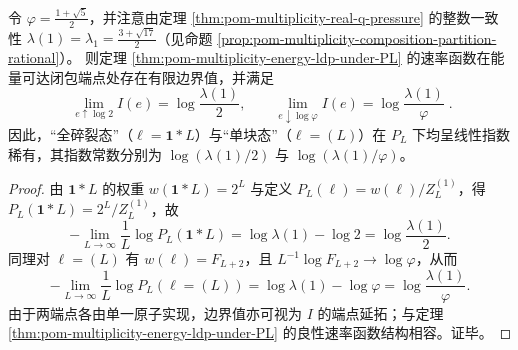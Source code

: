 \begin{corollary}\label{cor:pom-multiplicity-energy-ldp-boundary}
令 \(\varphi=\frac{1+\sqrt5}{2}\)，并注意由定理 \ref{thm:pom-multiplicity-real-q-pressure} 的整数一致性
\(
\lambda(1)=\lambda_1=\frac{3+\sqrt{17}}{2}
\)（见命题 \ref{prop:pom-multiplicity-composition-partition-rational}）。
则定理 \ref{thm:pom-multiplicity-energy-ldp-under-PL} 的速率函数在能量可达闭包端点处存在有限边界值，并满足
\[
\boxed{\;
\lim_{e\uparrow \log 2} I(e)=\log\frac{\lambda(1)}{2},\qquad
\lim_{e\downarrow \log\varphi} I(e)=\log\frac{\lambda(1)}{\varphi}\; } .
\]
因此，“全碎裂态”（\(\boldsymbol{\ell}=\boldsymbol{1}*L\)）与“单块态”（\(\boldsymbol{\ell}=(L)\)）在 \(P_L\) 下均呈线性指数稀有，其指数常数分别为 \(\log(\lambda(1)/2)\) 与 \(\log(\lambda(1)/\varphi)\)。
\end{corollary}
\begin{proof}
由 \(\boldsymbol{1}*L\) 的权重 \(w(\boldsymbol{1}*L)=2^L\) 与定义 \(P_L(\boldsymbol{\ell})=w(\boldsymbol{\ell})/Z_L^{(1)}\)，得
\(
P_L(\boldsymbol{1}*L)=2^L/Z_L^{(1)}
\)，故
\[
-\lim_{L\to\infty}\frac1L\log P_L(\boldsymbol{1}*L)=\log\lambda(1)-\log 2=\log\frac{\lambda(1)}{2}.
\]
同理对 \(\boldsymbol{\ell}=(L)\) 有 \(w(\boldsymbol{\ell})=F_{L+2}\)，且 \(L^{-1}\log F_{L+2}\to\log\varphi\)，从而
\[
-\lim_{L\to\infty}\frac1L\log P_L(\boldsymbol{\ell}=(L))=\log\lambda(1)-\log\varphi=\log\frac{\lambda(1)}{\varphi}.
\]
由于两端点各由单一原子实现，边界值亦可视为 \(I\) 的端点延拓；与定理 \ref{thm:pom-multiplicity-energy-ldp-under-PL} 的良性速率函数结构相容。证毕。
\end{proof}

